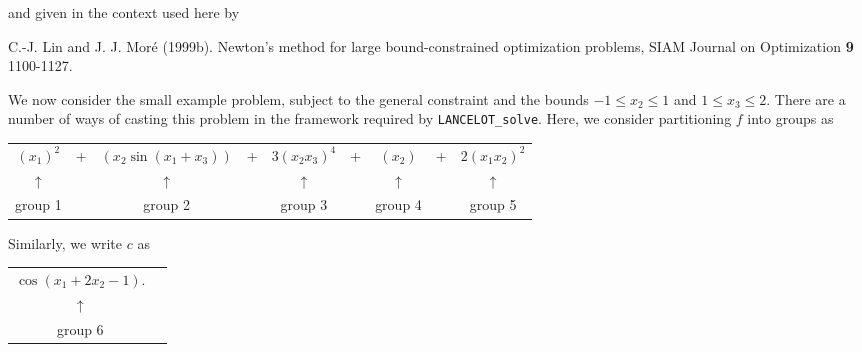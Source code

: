 \documentclass{galahad}
\newcommand{\fullpackagename}{LANC\-E\-LOT}
\newcommand{\solver}{{\tt \fullpackagename\_solve}}
\begin{document}
\noindent
and given in the context used here by

\noindent
C.-J. Lin and J. J. Mor\'{e} (1999b).
Newton's method for large bound-constrained optimization problems,
SIAM Journal on Optimization {\bf 9} 1100-1127.


\galexample
We now consider the small example problem,
subject to the general constraint
and the bounds $- 1 \leq x_2 \leq 1$ and
$1 \leq x_3 \leq 2$.
There are a number of ways of casting this problem in the
framework required by \solver.
Here, we consider partitioning $f$
into groups as
\begin{center}
\begin{tabular}{ccccccccc}
$(x_1)^2$  &+& $(x_2 \sin(x_1+x_3))$ &+& $3(x_2 x_3)^4$ &+& $(x_2)$   &+& $2(x_1 x_2)^2$  \\
$\uparrow$ & &     $\uparrow$        & & $\uparrow$     & & $\uparrow$ & & $\uparrow$\\
group 1    & &       group 2         & &   group 3      & & group 4    & & group 5
\end{tabular}
\end{center}

Similarly, we write $c$ as
\begin{center}
\begin{tabular}{cc}
$\cos(x_1 + 2 x_2 - 1)$. & \\ $\uparrow$ & \\ group 6 &
\end{tabular}
\end{center}
\end{document}

